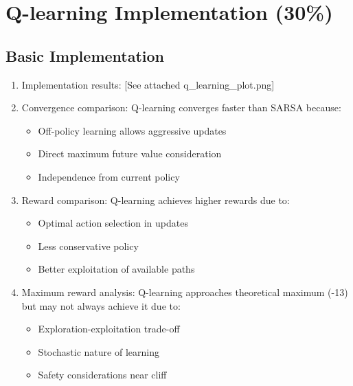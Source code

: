\documentclass{article}
\begin{document}
\section{Q-learning Implementation (30\%)}

\subsection{Basic Implementation}
\begin{enumerate}[label=(\arabic*)]
\item Implementation results: [See attached q\_learning\_plot.png]

\item Convergence comparison:
Q-learning converges faster than SARSA because:
\begin{itemize}
    \item Off-policy learning allows aggressive updates
    \item Direct maximum future value consideration
    \item Independence from current policy
\end{itemize}

\item Reward comparison:
Q-learning achieves higher rewards due to:
\begin{itemize}
    \item Optimal action selection in updates
    \item Less conservative policy
    \item Better exploitation of available paths
\end{itemize}

\item Maximum reward analysis:
Q-learning approaches theoretical maximum (-13) but may not always achieve it due to:
\begin{itemize}
    \item Exploration-exploitation trade-off
    \item Stochastic nature of learning
    \item Safety considerations near cliff
\end{itemize}
\end{enumerate}
\end{document}
